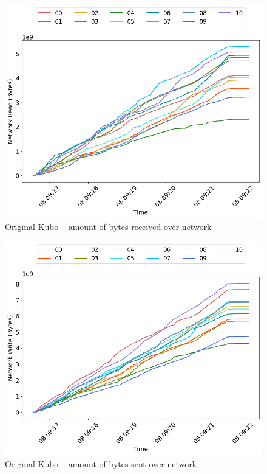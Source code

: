 \begin{minipage}{0.5\linewidth}
\begin{figure}[H]
\captionsetup{justification=centering,width=0.8\linewidth}
\includegraphics[width=\linewidth]{figures/original/net_read.png}
\caption{Original Kubo -- amount of bytes received over network}
\label{fig:original-net_read}
\end{figure}
\end{minipage}
\begin{minipage}{0.5\linewidth}
\begin{figure}[H]
\captionsetup{justification=centering,width=0.8\linewidth}
\includegraphics[width=\linewidth]{figures/original/net_write.png}
\caption{Original Kubo -- amount of bytes sent over network}
\label{fig:original-net_write}
\end{figure}
\end{minipage}

